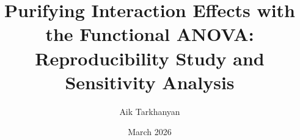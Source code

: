 
\title{Purifying Interaction Effects with the Functional ANOVA:\\ Reproducibility Study and Sensitivity Analysis}
\author{Aik Tarkhanyan}
\newcommand{\supervisor}{Dr.\ Giuseppe Casalicchio}
\date{March 2026}

\newcommand{\university}{Ludwig-Maximilians-Universit\"at M\"unchen}
\newcommand{\institution}{Faculty of Mathematics, Informatics and Statistics\\
Department of Statistics
}

\newcommand{\thesisfield}{Research Seminar in Explainable AI:\\ Reproducibility and Critical Evaluation of Methods}

\newcommand{\thesisdegree}{Technical Report}
